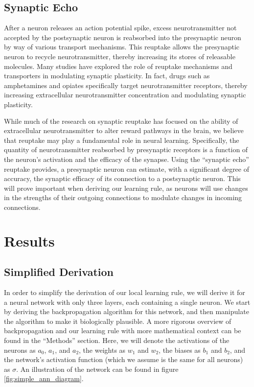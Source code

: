 \documentclass[12pt]{article}
\begin{document}
\subsection{Synaptic Echo}
After a neuron releases an action potential spike, excess neurotransmitter not accepted by the postsynaptic neuron is reabsorbed into the presynaptic neuron by way of various transport mechanisms. \cite{Rudnick1993} This reuptake allows the presynaptic neuron to recycle neurotransmitter, thereby increasing its stores of releasable molecules. \cite{Rudnick1993} Many studies have explored the role of reuptake mechanisms and transporters in modulating synaptic plasticity. \cite{Duman2016} In fact, drugs such as amphetamines and opiates specifically target neurotransmitter receptors, thereby increasing extracellular neurotransmitter concentration and modulating synaptic plasticity. \cite{Amara1998}

While much of the research on synaptic reuptake has focused on the ability of extracellular neurotransmitter to alter reward pathways in the brain, \cite{Koob1992} we believe that reuptake may play a fundamental role in neural learning. Specifically, the quantity of neurotransmitter reabsorbed by presynaptic receptors is a function of the neuron's activation and the efficacy of the synapse. Using the ``synaptic echo'' reuptake provides, a presynaptic neuron can estimate, with a significant degree of accuracy, the synaptic efficacy of its connection to a postsynaptic neuron. This will prove important when deriving our learning rule, as neurons will use changes in the strengths of their outgoing connections to modulate changes in incoming connections.

\section{Results}
\subsection{Simplified Derivation}
In order to simplify the derivation of our local learning rule, we will derive it for a neural network with only three layers, each containing a single neuron. We start by deriving the backpropagation algorithm for this network, and then manipulate the algorithm to make it biologically plausible. A more rigorous overview of backpropagation and our learning rule with more mathematical context can be found in the ``Methods'' section. Here, we will denote the activations of the neurons as $a_0$, $a_1$, and $a_2$, the weights as $w_1$ and $w_2$, the biases as $b_1$ and $b_2$, and the network's activation function (which we assume is the same for all neurons) as $\sigma$. An illustration of the network can be found in figure \ref{fig:simple_ann_diagram}.
\end{document}
